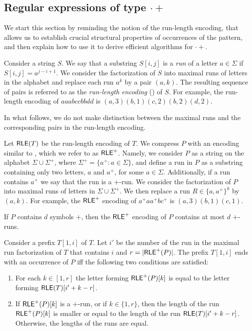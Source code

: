 \documentclass{article}
\begin{document}
\subsection{Regular expressions of type $\cdot+$}
\label{sec:dot-plus}

We start this section by reminding the notion of the run-length encoding, that allows us to establish crucial structural properties of occurrences of the pattern, and then explain how to use it to derive efficient algorithms for $\cdot+$.

\begin{definition}
\label{def:RLE}
Consider a string $S$. We say that a substring $S[i,j]$ is a \emph{run} of a letter $a \in \Sigma$ if $S[i,j]=a^{j-i+1}$. We consider the factorization of $S$ into maximal runs of letters in the alphabet and replace each run $a^k$ by a pair $(a,k)$. The resulting sequence of pairs is referred to as the \emph{run-length encoding} (\RLE) of $S$. For example, the run-length encoding of $aaabccbbdd$ is $(a,3) (b, 1) (c,2) (b,2) (d,2)$.
\end{definition}

In what follows, we do not make distinction between the maximal runs and the corresponding pairs in the run-length encoding.

Let $\textsf{RLE}(T)$ be the run-length encoding of $T$.
We compress $P$ with an encoding similar to \RLE, which we refer to as $\textsf{RLE}^+$.
Namely, we consider $P$ as a string on the alphabet $\Sigma \cup \Sigma^+$, where $ \Sigma^+ = \{a^+: a\in \Sigma \}$, and define a run in $P$ as a substring containing only two letters, $a$ and $a^+$, for some $a\in \Sigma$. Additionally, if a run contains $a^+$ we say that the run is a $+$-run. 
We consider the factorization of $P$ into maximal runs of letters in $\Sigma \cup \Sigma^+$. We then replace a run $R \in \{a, a^+ \}^k$ by $(a,k)$. For example, the $\textsf{RLE}^+$ encoding of $a^+ a a^+ b c^+$ is $(a, 3) (b, 1) (c, 1)$.

\begin{observation}
\label{obs:RLE+}
If $P$ contains $d$ symbols $+$, then the $\textsf{RLE}^+$ encoding of $P$ contains at most $d$ $+$-runs.
\end{observation}

\begin{observation}
\label{obs:structural+.}
Consider a prefix $T[1,i]$ of $T$. Let $i'$ be the number of the run in the maximal run factorization of $T$ that contains $i$ and $r = |\textsf{RLE}^+(P)|$. The prefix $T[1,i]$ ends with an occurrence of $P$ iff the following two conditions are satisfied:
\begin{enumerate}
\item For each $k \in [1,r]$ the letter forming $\textsf{RLE}^+(P)[k]$ is equal to the letter forming $\textsf{RLE}(T)[i'+ k -r]$.
\item If $\textsf{RLE}^+(P)[k]$ is a $+$-run, or if $k \in \{1,r\}$, then the length of the run $\textsf{RLE}^+(P)[k]$ is smaller or equal to the length of the run $\textsf{RLE}(T)[i'+ k -r]$. Otherwise, the lengths of the runs are equal.
\end{enumerate}
\end{observation}
\end{document}
